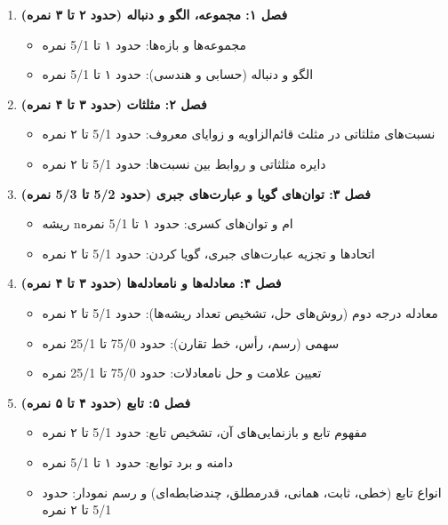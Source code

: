 \documentclass[12pt,a4paper]{article}
\begin{document}
\begin{enumerate}[label=\textbf{\arabic*.}, wide, labelindent=0pt]
    \item \textbf{فصل ۱: مجموعه، الگو و دنباله (حدود ۲ تا ۳ نمره)}
    \begin{itemize}
        \item مجموعه‌ها و بازه‌ها: حدود ۱ تا 5/1 نمره
        \item الگو و دنباله (حسابی و هندسی): حدود ۱ تا 5/1 نمره
    \end{itemize}

    \item \textbf{فصل ۲: مثلثات (حدود ۳ تا ۴ نمره)}
    \begin{itemize}
        \item نسبت‌های مثلثاتی در مثلث قائم‌الزاویه و زوایای معروف: حدود 5/1 تا ۲ نمره
        \item دایره مثلثاتی و روابط بین نسبت‌ها: حدود 5/1 تا ۲ نمره
    \end{itemize}

    \item \textbf{فصل ۳: توان‌های گویا و عبارت‌های جبری (حدود 5/2 تا 5/3 نمره)}
    \begin{itemize}
        \item ریشه nام و توان‌های کسری: حدود ۱ تا 5/1 نمره
        \item اتحادها و تجزیه عبارت‌های جبری، گویا کردن: حدود 5/1 تا ۲ نمره
    \end{itemize}

    \item \textbf{فصل ۴: معادله‌ها و نامعادله‌ها (حدود ۳ تا ۴ نمره)}
    \begin{itemize}
        \item معادله درجه دوم (روش‌های حل، تشخیص تعداد ریشه‌ها): حدود 5/1 تا ۲ نمره
        \item سهمی (رسم، رأس، خط تقارن): حدود 75/0 تا 25/1 نمره
        \item تعیین علامت و حل نامعادلات: حدود 75/0 تا 25/1 نمره
    \end{itemize}

    \item \textbf{فصل ۵: تابع (حدود ۴ تا ۵ نمره)}
    \begin{itemize}
        \item مفهوم تابع و بازنمایی‌های آن، تشخیص تابع: حدود 5/1 تا ۲ نمره
        \item دامنه و برد توابع: حدود ۱ تا 5/1 نمره
        \item انواع تابع (خطی، ثابت، همانی، قدرمطلق، چندضابطه‌ای) و رسم نمودار: حدود 5/1 تا ۲ نمره
    \end{itemize}


\end{enumerate}
\end{document}
